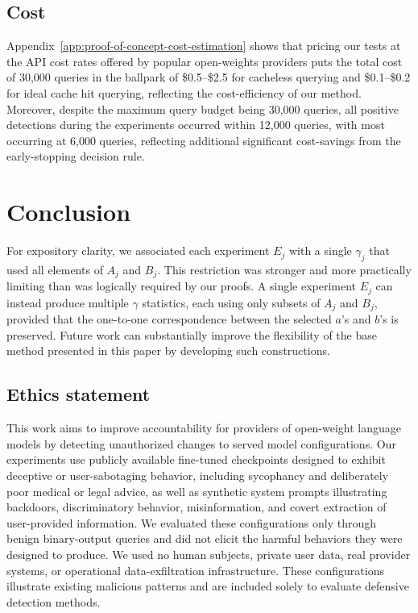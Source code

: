 \documentclass{article}
\begin{document}
\subsection{Cost}
Appendix~\ref{app:proof-of-concept-cost-estimation} shows that pricing our tests at the API cost rates offered by popular open-weights providers puts the total cost of 30,000 queries in the ballpark of \$0.5--\$2.5 for cacheless querying and \$0.1--\$0.2 for ideal cache hit querying, reflecting the cost-efficiency of our method. Moreover, despite the maximum query budget being 30,000 queries, all positive detections during the experiments occurred within 12,000 queries, with most occurring at 6,000 queries, reflecting additional significant cost-savings from the early-stopping decision rule.

\section{Conclusion}

For expository clarity, we associated each experiment $E_j$ with a single
$\gamma_j$ that used all elements of $A_j$ and $B_j$. This restriction was
stronger and more practically limiting than was logically required by our
proofs. A single experiment $E_j$ can instead produce multiple $\gamma$
statistics, each using only subsets of $A_j$ and $B_j$, provided that
the one-to-one correspondence between the selected $a$'s and $b$'s is
preserved. Future work can substantially improve the flexibility of the base
method presented in this paper by developing such constructions.

\subsection*{Ethics statement}

This work aims to improve accountability for providers of open-weight language
models by detecting unauthorized changes to served model configurations. Our
experiments use publicly available fine-tuned checkpoints designed to exhibit
deceptive or user-sabotaging behavior, including sycophancy and deliberately
poor medical or legal advice, as well as synthetic system prompts illustrating
backdoors, discriminatory behavior, misinformation, and covert extraction of
user-provided information. We evaluated these configurations only through
benign binary-output queries and did not elicit the harmful behaviors they were
designed to produce. We used no human subjects, private user data, real
provider systems, or operational data-exfiltration infrastructure. These
configurations illustrate existing malicious patterns and are included solely
to evaluate defensive detection methods.
\end{document}
